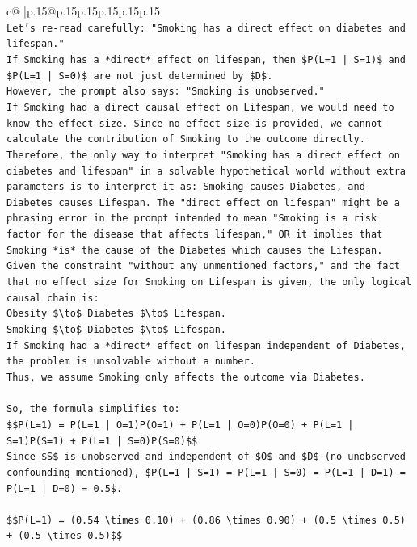 \documentclass{article}
\begin{document}
{\begin{supertabular}{c@{$\;$}|p{.15\linewidth}@{}p{.15\linewidth}p{.15\linewidth}p{.15\linewidth}p{.15\linewidth}p{.15\linewidth}}
{{{\\ 
\texttt{Let's re{-}read carefully: "Smoking has a direct effect on diabetes and lifespan."} \\
\texttt{If Smoking has a *direct* effect on lifespan, then \$P(L=1 | S=1)\$ and \$P(L=1 | S=0)\$ are not just determined by \$D\$.} \\
\texttt{However, the prompt also says: "Smoking is unobserved."} \\
\texttt{If Smoking had a direct causal effect on Lifespan, we would need to know the effect size. Since no effect size is provided, we cannot calculate the contribution of Smoking to the outcome directly.} \\
\texttt{Therefore, the only way to interpret "Smoking has a direct effect on diabetes and lifespan" in a solvable hypothetical world without extra parameters is to interpret it as: Smoking causes Diabetes, and Diabetes causes Lifespan. The "direct effect on lifespan" might be a phrasing error in the prompt intended to mean "Smoking is a risk factor for the disease that affects lifespan," OR it implies that Smoking *is* the cause of the Diabetes which causes the Lifespan.} \\
\texttt{Given the constraint "without any unmentioned factors," and the fact that no effect size for Smoking on Lifespan is given, the only logical causal chain is:} \\
\texttt{Obesity \$\textbackslash{}to\$ Diabetes \$\textbackslash{}to\$ Lifespan.} \\
\texttt{Smoking \$\textbackslash{}to\$ Diabetes \$\textbackslash{}to\$ Lifespan.} \\
\texttt{If Smoking had a *direct* effect on lifespan independent of Diabetes, the problem is unsolvable without a number.} \\
\texttt{Thus, we assume Smoking only affects the outcome via Diabetes.} \\
\\ 
\texttt{So, the formula simplifies to:} \\
\texttt{\$\$P(L=1) = P(L=1 | O=1)P(O=1) + P(L=1 | O=0)P(O=0) + P(L=1 | S=1)P(S=1) + P(L=1 | S=0)P(S=0)\$\$} \\
\texttt{Since \$S\$ is unobserved and independent of \$O\$ and \$D\$ (no unobserved confounding mentioned), \$P(L=1 | S=1) = P(L=1 | S=0) = P(L=1 | D=1) = P(L=1 | D=0) = 0.5\$.} \\
\\ 
\texttt{\$\$P(L=1) = (0.54 \textbackslash{}times 0.10) + (0.86 \textbackslash{}times 0.90) + (0.5 \textbackslash{}times 0.5) + (0.5 \textbackslash{}times 0.5)\$\$} \\
}}}
\end{supertabular}}
\end{document}
